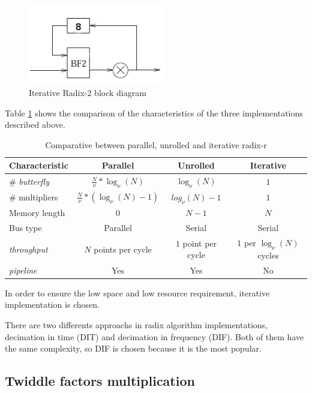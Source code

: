 \documentclass[conference]{IEEEtran}
\begin{document}
\begin{figure}[htb!]
        \centering
        \includegraphics[width=6cm]{./figures/r2sBf.png}
        \caption{Iterative Radix-2 block diagram}
        \label{fig:r2sBf}
\end{figure}

Table \ref{table:radixcomp} shows the comparison of the characteristics of the three implementations described above.

\begin{table}[htb!]
\centering
\caption{Comparative between parallel, unrolled and iterative radix-r}
\begin{tabular}{l c c c}
\textbf{Characteristic} & \textbf{Parallel} & \textbf{Unrolled} &
\textbf{Iterative}\\
\hline 
\# \textit{butterfly} & $\frac{N}{\nu}*\log_\nu(N)$ & $\log_\nu(N)$ & $1$ \\
\# multipliers & $\frac{N}{\nu}*(\log_\nu(N)-1)$ & $log_\nu(N)-1$ & $1$ \\
Memory length & $0$ & $N-1$ & $N$ \\
Bus type & Parallel & Serial & Serial \\
\textit{throughput} & $N$ points per cycle & $1$ point per cycle & $1$ per $\log_\nu(N)$
cycles\\
\textit{pipeline} & Yes & Yes & No\\
\hline
\end{tabular}
\label{table:radixcomp}
\end{table}

In order to ensure the low space and low resource requirement, iterative implementation is chosen.

There are two differents approachs in radix algorithm implementations, decimation in time (DIT) and decimation in frequency (DIF). Both of them have the same 
complexity, so DIF is chosen because it is the most popular. 

\subsection{Twiddle factors multiplication}
\end{document}
